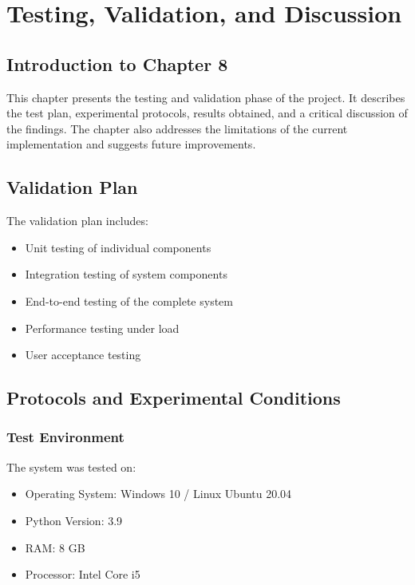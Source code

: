 \chapter{Testing, Validation, and Discussion}

\section*{Introduction to Chapter 8}

This chapter presents the testing and validation phase of the project. It describes the test plan, experimental protocols, results obtained, and a critical discussion of the findings. The chapter also addresses the limitations of the current implementation and suggests future improvements.

\section{Validation Plan}

The validation plan includes:
\begin{itemize}
    \item Unit testing of individual components
    \item Integration testing of system components
    \item End-to-end testing of the complete system
    \item Performance testing under load
    \item User acceptance testing
\end{itemize}

\section{Protocols and Experimental Conditions}

\subsection{Test Environment}

The system was tested on:
\begin{itemize}
    \item Operating System: Windows 10 / Linux Ubuntu 20.04
    \item Python Version: 3.9
    \item RAM: 8 GB
    \item Processor: Intel Core i5
\end{itemize}

